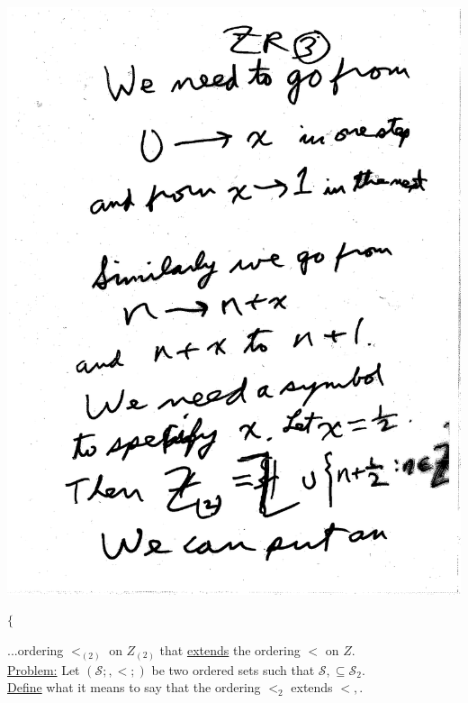 \documentclass[10pt,a4paper]{article}
\begin{document}
{{\includegraphics[scale=0.5]{Pages/ZR_3}

$\{$

\newpage

...ordering $<_{(2)}$ on $Z_{(2)}$ that \underline{extends} the ordering $<$ on $Z$. \\ 
\underline{Problem:} Let $(\mathcal{S};, <;)$ be two ordered sets such that $\mathcal{S}, \subseteq \mathcal{S}_2$.\\
\underline{Define} what it means to say that the ordering $<_{2}$ extends $<,$.\\

}}
\end{document}
